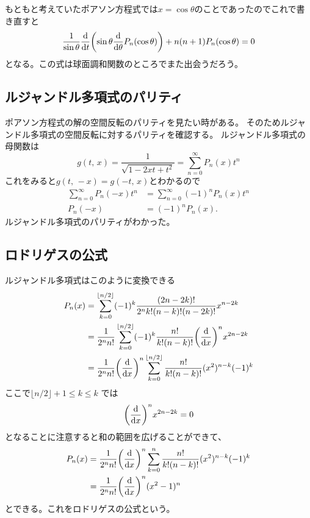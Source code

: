 \documentclass[../../master.tex]{subfiles}
\begin{document}
もともと考えていたポアソン方程式では\(x=\cos\theta\)のことであったのでこれで書き直すと
\begin{equation}
	\frac{1}{\sin\theta}\dv{t}\qty(\sin\theta\dv{\theta}P_n(\cos\theta)) + n(n+1)P_n(\cos\theta) =0 \label{eq:legendre_dif_eq2}
\end{equation}
となる。この式は球面調和関数のところでまた出会うだろう。

\subsection{ルジャンドル多項式のパリティ}
ポアソン方程式の解の空間反転のパリティを見たい時がある。
そのためルジャンドル多項式の空間反転に対するパリティを確認する。
ルジャンドル多項式の母関数は
\begin{equation}
	g(t,\,x) = \frac{1}{\sqrt{1-2xt + t^2}} = \sum_{n=0}^{\infty}P_n(x)t^n
\end{equation}
これをみると\(g(t,\,-x)=g(-t,\,x)\)とわかるので
\begin{align}
	\sum_{n=0}^{\infty} P_n(-x)t^n & = \sum_{n=0}^{\infty} (-1)^n P_n(x)t^n \\
	P_n(-x)                        & = (-1)^n P_n(x).
\end{align}
ルジャンドル多項式のパリティがわかった。

\subsection{ロドリゲスの公式}
ルジャンドル多項式はこのように変換できる
\begin{align}
	P_n(x) & = \sum_{k=0}^{\lfloor n/2 \rfloor}(-1)^k \frac{(2n-2k)!}{2^n k!(n-k)!(n-2k)!}x^{n-2k}                \\
	       & =\frac{1}{2^n n!}\sum_{k=0}^{\lfloor n/2 \rfloor}(-1)^k \frac{n!}{k!(n-k)!}\qty(\dv{x})^nx^{2n-2k}   \\
	       & =\frac{1}{2^n n!}\qty(\dv{x})^n\sum_{k=0}^{\lfloor n/2 \rfloor} \frac{n!}{k!(n-k)!}(x^2)^{n-k}(-1)^k
\end{align}
ここで\(\lfloor n/2 \rfloor + 1 \leq k \leq k\) では
\begin{equation}
	\qty(\dv{x})^n x^{2n-2k} =0
\end{equation}
となることに注意すると和の範囲を広げることができて、
\begin{align}
	P_n(x) & = \frac{1}{2^n n!}\qty(\dv{x})^n\sum_{k=0}^{n} \frac{n!}{k!(n-k)!}(x^2)^{n-k}(-1)^k \\
	       & = \frac{1}{2^n n!}\qty(\dv{x})^n(x^2-1)^n
\end{align}
とできる。これをロドリゲスの公式という。
\end{document}
